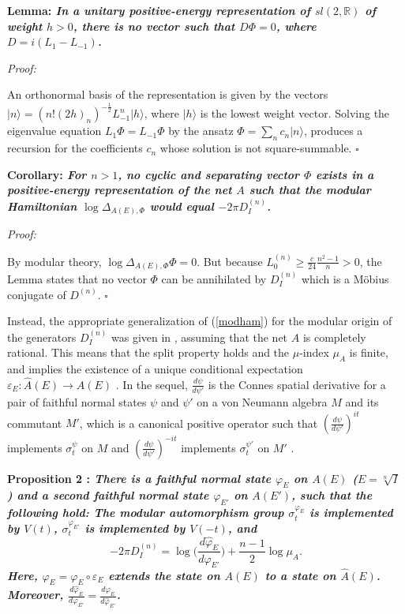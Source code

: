 \documentclass[12pt]{article}
\def\eps{\varepsilon}
\def \RR {{\mathbb R}}
\def \ket#1{{\vert #1\rangle}}
\def\be{\begin{equation}} \def\bea{\begin{eqnarray}}
\def\ee{\end{equation}}\def\ea{\end{array}}
\def \QED {\hspace*{\fill}$\square$\medskip}
\newcommand{\dd}[2]{\frac{d{#2}}{d{#1}}}
\begin{document}
\medskip 

{\bf Lemma: \sl In a unitary positive-energy representation of
  $sl(2,\RR)$ of weight $h > 0$, there is no vector such that
  $D\Phi=0$, where $D=i(L_1-L_{-1})$. 

\it Proof:} An orthonormal basis of the
representation is given by the vectors $\ket n = (n!(2h)_n)^{-\frac
  12}L_{-1}^n\ket h$, where $\ket h$ is the lowest weight
vector. Solving the eigenvalue equation $L_1\Phi=L_{-1}\Phi$ by the
ansatz $\Phi=\sum_n c_n \ket n$, produces a recursion for the
coefficients $c_n$ whose solution is not square-summable.
\QED


{\bf Corollary: \sl For $n>1$, no cyclic and separating vector $\Phi$
  exists in a positive-energy representation of the net $A$ such that
  the modular Hamiltonian $\log\Delta_{A(E),\Phi}$ would equal 
  $-2\pi D_I^{(n)}$. 

\medskip 

\it Proof:} By modular theory, $\log\Delta_{A(E),\Phi}\Phi=0$. 
But because $L^{(n)}_0\geq \frac c{24}\frac{n^2-1}{n} > 0$, the Lemma
states that no vector $\Phi$ can be annihilated by $D^{(n)}_I$ which
is a Möbius conjugate of $D^{(n)}$.  
\QED

Instead, the appropriate generalization of (\ref{modham}) for the
modular origin of the generators $D_I^{(n)}$ was given in \cite{KL05},
assuming that the net $A$ is completely rational. This means that the
split property holds and the $\mu$-index $\mu_A$ is finite, and
implies the existence of a unique conditional expectation
$\eps_{E}:\widehat A(E)\to A(E)$ \cite{KLM}. In the sequel,
$\dd{\psi'}\psi$ is the Connes spatial derivative for a pair of
faithful normal states $\psi$ and $\psi'$ on a von Neumann algebra $M$
and its commutant $M'$, which is a canonical positive operator such
that $(\dd{\psi'}\psi)^{it}$ implements $\sigma^\psi_t$ on $M$ and
$(\dd{\psi'}\psi)^{-it}$ implements $\sigma^{\psi'}_t$ on $M'$
\cite{C}.  

\medskip

{\bf Proposition 2 \rm \cite{KL05}: \sl There is a faithful normal
  state $\varphi_E$ on $A(E)$ ($E=\sqrt[n]I$) and a second faithful
  normal state $\varphi_{E'}$ on $A(E')$, such that the following
  hold: The modular automorphism group $\sigma_t^{\varphi_{E}}$ is
  implemented by $V(t)$, $\sigma_t^{\varphi_{E'}}$ is implemented by
  $V(-t)$, and 
\be
\label{modori} 
  -2\pi D_I^{(n)}
  =\log\big(\frac{d\widehat\varphi_{E}}{d\varphi_{E'}}\big) + 
  \frac{n-1}2\log\mu_A.
\ee
Here, $\widehat\varphi_{E}=\varphi_{E}\circ\eps_{E}$ extends the
state on $A(E)$ to a state on $\widehat A(E)$. Moreover, 
$\frac{d\widehat\varphi_{E}}{d\varphi_{E'}} = 
\frac{d\varphi_{E}}{d\widehat\varphi_{E'}}$. }
\end{document}
